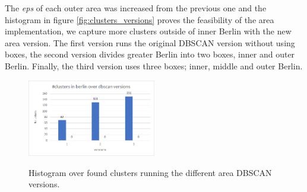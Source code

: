 The \textit{eps} of each outer area was increased from the previous one and the histogram in figure \autoref{fig:clusters_versions} proves the feasibility of the area implementation, we capture more clusters outside of inner Berlin with the new area version. The first version runs the original DBSCAN version without using boxes, the second version divides greater Berlin into two boxes, inner and outer Berlin. Finally, the third version uses three boxes; inner, middle and outer Berlin.\begin{figure}
    \centering
    \includegraphics[width=0.5\textwidth]{images/clusters_versions.png}\\
    \caption{ Histogram over found clusters running the different area DBSCAN versions.}
    \label{fig:clusters_versions}
\end{figure}


